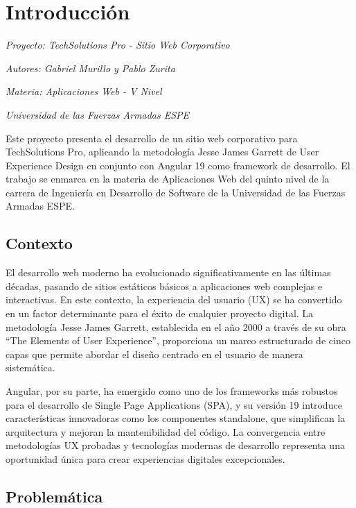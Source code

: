 \chapter{Introducción}
\label{cp:introduccion}

{
\parindent0pt

\textit{Proyecto: TechSolutions Pro - Sitio Web Corporativo}

\textit{Autores: Gabriel Murillo y Pablo Zurita}

\textit{Materia: Aplicaciones Web - V Nivel}

\textit{Universidad de las Fuerzas Armadas ESPE}

\vspace{.935em}

Este proyecto presenta el desarrollo de un sitio web corporativo para TechSolutions Pro, aplicando la metodología Jesse James Garrett de User Experience Design en conjunto con Angular 19 como framework de desarrollo. El trabajo se enmarca en la materia de Aplicaciones Web del quinto nivel de la carrera de Ingeniería en Desarrollo de Software de la Universidad de las Fuerzas Armadas ESPE.
}

\section{Contexto}

El desarrollo web moderno ha evolucionado significativamente en las últimas décadas, pasando de sitios estáticos básicos a aplicaciones web complejas e interactivas. En este contexto, la experiencia del usuario (UX) se ha convertido en un factor determinante para el éxito de cualquier proyecto digital. La metodología Jesse James Garrett, establecida en el año 2000 a través de su obra ``The Elements of User Experience'', proporciona un marco estructurado de cinco capas que permite abordar el diseño centrado en el usuario de manera sistemática.

Angular, por su parte, ha emergido como uno de los frameworks más robustos para el desarrollo de Single Page Applications (SPA), y su versión 19 introduce características innovadoras como los componentes standalone, que simplifican la arquitectura y mejoran la mantenibilidad del código. La convergencia entre metodologías UX probadas y tecnologías modernas de desarrollo representa una oportunidad única para crear experiencias digitales excepcionales.

\section{Problemática}

